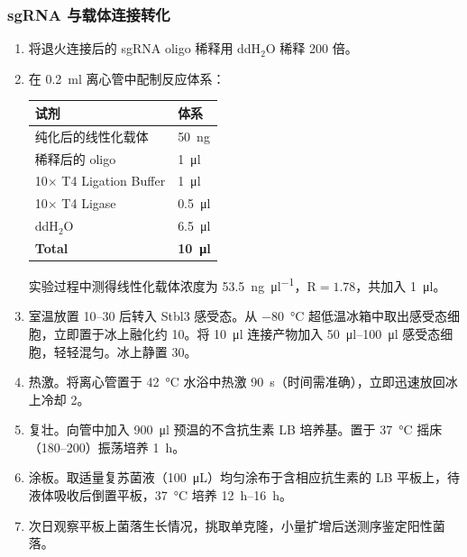 \subsubsection{sgRNA 与载体连接转化}
\begin{enumerate}
    \item 将退火连接后的 sgRNA oligo 稀释用 ddH\(_2\)O 稀释 200 倍。
    \item 在 \qty{0.2}{\ml} 离心管中配制反应体系：
    
    \begin{table}[H]
        \centering
        \begin{tabular}{C{5cm} C{5cm}}
            \toprule
            \textbf{试剂} & \textbf{体系} \\
            \midrule
            纯化后的线性化载体                   & \qty{50}{\ng} \\
            稀释后的 oligo                     & \qty{1}{\ul} \\
            10\(\times\) T4 Ligation Buffer   & \qty{1}{\ul} \\
            10\(\times\) T4 Ligase            & \qty{0.5}{\ul} \\
            ddH$_2$O                          & \qty{6.5}{\ul}\\
            \midrule
            \textbf{Total}      & \textbf{\qty{10}{\ul}} \\
            \bottomrule
        \end{tabular}
    \end{table}

    实验过程中测得线性化载体浓度为 \qty{53.5}{\ng \per \ul}，\(\mathrm{R}=1.78\)，共加入 \qty{1}{\ul}。

    \item 室温放置 \qtyrange{10}{30}{\min} 后转入 Stbl3 感受态。从 \qty{-80}{\celsius} 超低温冰箱中取出感受态细胞，立即置于冰上融化约 \qty{10}{\min}。将 \qty{10}{\ul} 连接产物加入 \qtyrange{50}{100}{\ul} 感受态细胞，轻轻混匀。冰上静置 \qty{30}{\min}。
    \item 热激。将离心管置于 \qty{42}{\celsius} 水浴中热激 \qty{90}{\s}（时间需准确），立即迅速放回冰上冷却 \qty{2}{\min}。
    \item 复壮。向管中加入 \qty{900}{\ul} 预温的不含抗生素 LB 培养基。置于 \qty{37}{\celsius} 摇床（\qtyrange{180}{200}{\rpm}）振荡培养 \qty{1}{\hour}。
    \item 涂板。取适量复苏菌液（\qty{100}{\uL}）均匀涂布于含相应抗生素的 LB 平板上，待液体吸收后倒置平板，\qty{37}{\celsius} 培养 \qtyrange{12}{16}{\hour}。
    \item 次日观察平板上菌落生长情况，挑取单克隆，小量扩增后送测序鉴定阳性菌落。
\end{enumerate}

